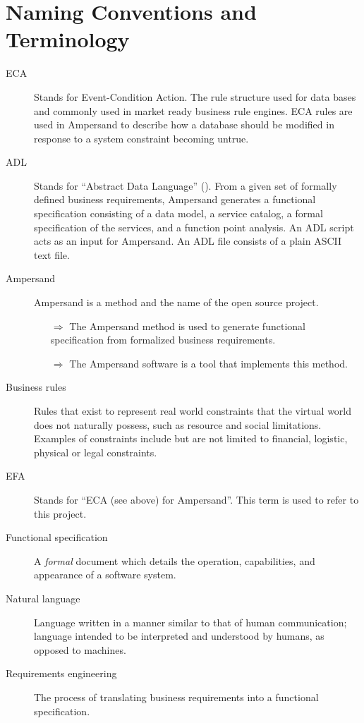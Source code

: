 \documentclass[12pt]{report}
\begin{document}
\section{Naming Conventions and Terminology}\label{sec:Naming} 


\begin{description}
\item[ECA] Stands for Event-Condition Action. The rule structure used for data
  bases and commonly used in market ready business rule engines. ECA rules are
  used in Ampersand to describe how a database should be modified in response to
  a system constraint becoming untrue.
  
\item [ADL] Stands for ``Abstract Data Language'' (\cite[13]{derFun}). From a
given set of formally defined business requirements, Ampersand generates a
functional specification consisting of a data model, a service catalog, a
formal specification of the services, and a function point analysis. An ADL
script acts as an input for Ampersand. An ADL file consists of a plain ASCII
text file.
\item [Ampersand] Ampersand is a method and the name of the open source 
project. 
    \begin{itemize}
        \item[$\Rightarrow$] The Ampersand method is used to generate
        functional specification from formalized business requirements.
        \item[$\Rightarrow$] The Ampersand software is a tool that implements 
        this method.
    \end{itemize} 
    
\item [Business rules] Rules that exist to represent real world 
constraints that the virtual world does not naturally possess, such as resource 
and social limitations. Examples of constraints include but are not limited to 
financial, logistic, physical or legal constraints.

\item [EFA] Stands for ``ECA (see above) for Ampersand''. This term is used to 
refer to this project. 
\item [Functional specification] A \emph{formal} document which details the 
operation, capabilities, and appearance of a software system. 

\item [Natural language] Language written in a manner similar to that of human 
communication; 
  language intended to be interpreted and understood by humans, as opposed to 
  machines. 
  
\item [Requirements engineering] The process of translating business
requirements into a functional specification. 
\end{description}
\end{document}

